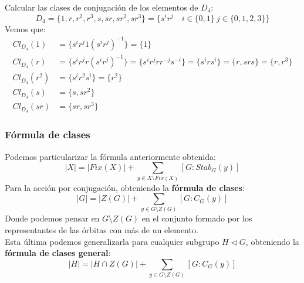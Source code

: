 \begin{ejemplo}
    Calcular las clases de conjugación de los elementos de $D_4$:
    \begin{equation*}
        D_4 = \{1,r,r^2, r^3, s, sr, sr^2, sr^3\} = \{s^i r^j \quad i \in \{0,1\}\ j \in \{0,1,2,3\}\}
    \end{equation*}
    Vemos que:
    \begin{align*}
        Cl_{D_4}(1) &= \{s^ir^j 1 {(s^i r^j)}^{-1}\} = \{1\} \\
        Cl_{D_4}(r) &= \{s^ir^j r {(s^i r^j)}^{-1}\} = \{s^i r^j rr^{-j}s^{-i}\} = \{s^i r s^{i}\} = \{r, srs\} = \{r,r^3\} \\ %
        Cl_{D_4}(r^2) &= \{s^i r^2 s^i\} = \{r^2\} \\
        Cl_{D_4}(s) &= \{s,sr^2\} \\
        Cl_{D_4}(sr) &= \{sr,sr^3\} 
    \end{align*}
\end{ejemplo}

\subsubsection{Fórmula de clases}
\noindent
Podemos particularizar la fórmula anteriormente obtenida:
\begin{equation*}
    |X| = |Fix(X)| + \sum_{y\in X\setminus Fix(X)} [G:Stab_G(y)]
\end{equation*}
Para la acción por conjugación, obteniendo la \textbf{fórmula de clases}:
\begin{equation*}
    |G| = |Z(G)| + \sum_{y\in G\setminus Z(G)} [G:C_G(y)]
\end{equation*}
Donde podemos pensar en $G\setminus Z(G)$ en el conjunto formado por los representantes de las órbitas con más de un elemento.\\

\noindent
Esta última podemos generalizarla para cualquier subgrupo $H\lhd G$, obteniendo la \textbf{fórmula de clases general}:
\begin{equation*}
    |H| = |H\cap Z(G)| + \sum_{y\in G\setminus Z(G)} [G:C_G(y)]
\end{equation*}


